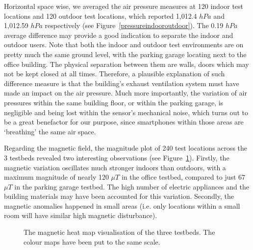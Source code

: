\documentclass[graybox]{svmult}
\begin{document}
Horizontal space wise, we averaged the air pressure measures at 120 indoor test locations and 120 outdoor test locations, which reported 1,012.4 $hPa$ and 1,012.59 $hPa$ respectively (see Figure~\ref{pressureindooroutdoor}). The 0.19 $hPa$ average difference may provide a good indication to separate the indoor and outdoor users. Note that both the indoor and outdoor test environments are on pretty much the same ground level, with the parking garage locating next to the office building. The physical separation between them are walls, doors which may not be kept closed at all times. Therefore, a plausible explanation of such difference measure is that the building's exhaust ventilation system must have made an impact on the air pressure. Much more importantly, the variation of air pressures within the same building floor, or within the parking garage, is negligible and being lost within the sensor's mechanical noise, which turns out to be a great benefactor for our purpose, since smartphones within those areas are `breathing' the same air space.

Regarding the magnetic field, the magnitude plot of 240 test locations across the 3 testbeds revealed two interesting observations (see Figure~\ref{heatmaps}). Firstly, the magnetic variation oscillates much stronger indoors than outdoors, with a maximum magnitude of nearly 120 $\mu T$ in the office testbed, compared to just 67 $\mu T$ in the parking garage testbed. The high number of electric appliances and the building materials may have been accounted for this variation. Secondly, the magnetic anomalies happened in small areas (i.e. only locations within a small room will have similar high magnetic disturbance).
\begin{figure}[!ht]
	\centering
	
	\hspace{0.5pt}
	\hfil
	
	\caption{The magnetic heat map visualisation of the three testbeds. The colour maps have been put to the same scale.}
	\label{heatmaps}
\end{figure}
\end{document}
